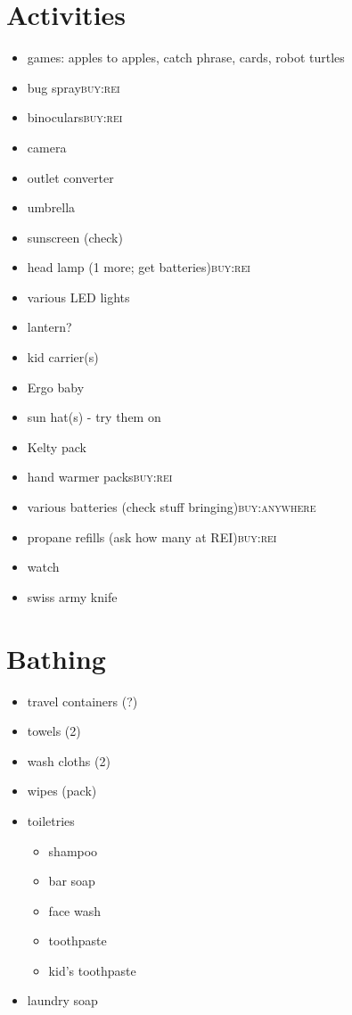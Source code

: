 \documentclass[11pt]{article}
\begin{document}
\section*{Activities}
\label{sec-5}
\begin{itemize}
\item games: apples to apples, catch phrase, cards, robot turtles
\label{sec-5-1}
\item bug spray\hfill{}\textsc{buy:rei}
\label{sec-5-2}
\item binoculars\hfill{}\textsc{buy:rei}
\label{sec-5-3}
\item camera
\label{sec-5-4}
\item outlet converter
\label{sec-5-5}
\item umbrella
\label{sec-5-6}
\item sunscreen (check)
\label{sec-5-7}
\item head lamp (1 more; get batteries)\hfill{}\textsc{buy:rei}
\label{sec-5-8}
\item various LED lights
\label{sec-5-9}
\item lantern?
\label{sec-5-10}
\item kid carrier(s)
\label{sec-5-11}
\item Ergo baby
\label{sec-5-12}
\item sun hat(s) - try them on
\label{sec-5-13}
\item Kelty pack
\label{sec-5-14}
\item hand warmer packs\hfill{}\textsc{buy:rei}
\label{sec-5-15}
\item various batteries (check stuff bringing)\hfill{}\textsc{buy:anywhere}
\label{sec-5-16}
\item propane refills (ask how many at REI)\hfill{}\textsc{buy:rei}
\label{sec-5-17}
\item watch
\label{sec-5-18}
\item swiss army knife
\label{sec-5-19}
\end{itemize}

\section*{Bathing}
\label{sec-6}
\begin{itemize}
\item travel containers (?)
\label{sec-6-1}
\item towels (2)
\label{sec-6-2}
\item wash cloths (2)
\label{sec-6-3}
\item wipes (pack)
\label{sec-6-4}
\item\relax [0/6] toiletries
\label{sec-6-5}
\begin{itemize}
\item shampoo
\label{sec-6-5-1}
\item bar soap
\label{sec-6-5-2}
\item face wash
\label{sec-6-5-3}
\item toothpaste
\label{sec-6-5-4}
\item kid's toothpaste
\label{sec-6-5-5}
\end{itemize}
\item laundry soap
\label{sec-6-6}
\end{itemize}
\end{document}
